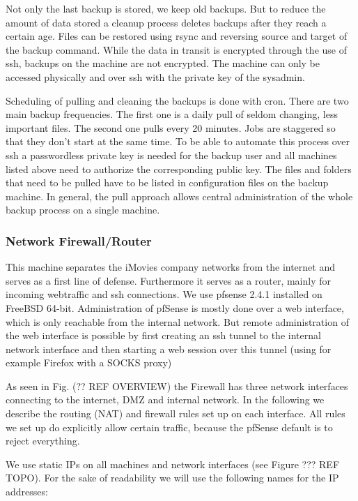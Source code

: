 \documentclass[english]{article}
\begin{document}
Not only the last backup is stored, we keep old backups. But to reduce the amount of data stored a cleanup process deletes backups after they reach a certain age. Files can be restored using rsync and reversing source and target of the backup command. 
While the data in transit is encrypted through the use of ssh, backups on the machine are not encrypted. The machine can only be accessed physically and over ssh with the private key of the sysadmin.

Scheduling of pulling and cleaning the backups is done with cron. There are two main backup frequencies. The first one is a daily pull of seldom changing, less important files. The second one pulls every 20 minutes. Jobs are staggered so that they don't start at the same time. To be able to automate this process over ssh a passwordless private key is needed for the backup user and all machines listed above need to authorize the corresponding public key.
The files and folders that need to be pulled have to be listed in configuration files on the backup machine. In general, the pull approach allows central administration of the whole backup process on a single machine.




\subsubsection{Network Firewall/Router}

This machine separates the iMovies company networks from the internet and serves as a first line of defense. Furthermore it serves as a router, mainly for incoming webtraffic and ssh connections. We use pfsense 2.4.1 installed on FreeBSD 64-bit. Administration of pfSense is mostly done over a web interface, which is only reachable from the internal network. But remote administration of the web interface is possible by first creating an ssh tunnel to the internal network interface and then starting a web session over this tunnel (using for example Firefox with a SOCKS proxy) 

As seen in Fig. (?? REF OVERVIEW) the Firewall has three network interfaces connecting to the internet, DMZ and internal network. In the following we describe the routing (NAT) and firewall rules set up on each interface. All rules we set up do explicitly allow certain traffic, because the pfSense default is to reject everything. 

We use static IPs on all machines and network interfaces (see Figure ??? REF TOPO). For the sake of readability we will use the following names for the IP addresses:
\end{document}

